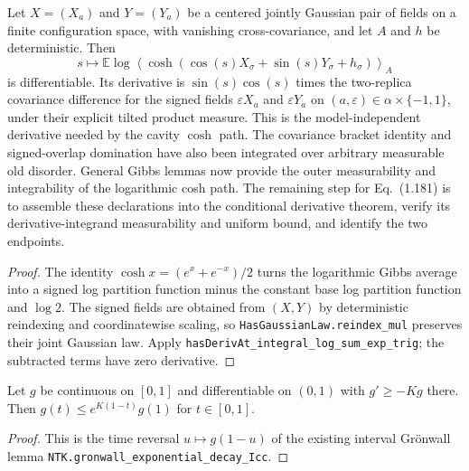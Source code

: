 \begin{lemma}
\label{lem:sg-tal:log-cosh-gaussian-derivative}
  \leanok
{}
Let $X=(X_a)$ and $Y=(Y_a)$ be a centered jointly Gaussian pair of fields on a finite
configuration space, with vanishing cross-covariance, and let $A$ and $h$ be deterministic.
Then
\[
 s\longmapsto \mathbb E\log\left\langle
   \cosh(\cos(s)X_\sigma+\sin(s)Y_\sigma+h_\sigma)\right\rangle_A
\]
is differentiable.  Its derivative is $\sin(s)\cos(s)$ times the two-replica covariance
difference for the signed fields $\varepsilon X_a$ and $\varepsilon Y_a$ on
$(a,\varepsilon)\in\alpha\times\{-1,1\}$, under their explicit tilted product measure.
This is the model-independent derivative needed by the cavity $\cosh$ path.  The covariance
bracket identity and signed-overlap domination have also been integrated over arbitrary
measurable old disorder.  General Gibbs lemmas now provide the outer measurability and
integrability of the logarithmic cosh path.  The remaining step for Eq.~(1.181) is to assemble
these declarations into the conditional derivative theorem, verify its derivative-integrand
measurability and uniform bound, and identify the two endpoints.
\end{lemma}
\begin{proof}
  \leanok
The identity $\cosh x=(e^x+e^{-x})/2$ turns the logarithmic Gibbs average into a signed log
partition function minus the constant base log partition function and $\log 2$.
The signed fields are obtained from $(X,Y)$ by deterministic reindexing and coordinatewise
scaling, so \texttt{HasGaussianLaw.reindex\_mul} preserves their joint Gaussian law.
Apply \texttt{hasDerivAt\_integral\_log\_sum\_exp\_trig}; the subtracted terms have zero derivative.
\end{proof}

\begin{lemma}
\label{lem:sg-tal:gronwall-backward}
  \leanok
{}
Let $g$ be continuous on $[0,1]$ and differentiable on $(0,1)$ with $g'\ge-Kg$ there. Then
$g(t)\le e^{K(1-t)}g(1)$ for $t\in[0,1]$.
\end{lemma}
\begin{proof}
  \leanok
This is the time reversal $u\mapsto g(1-u)$ of the existing interval Gr\"onwall lemma
\texttt{NTK.gronwall\_exponential\_decay\_Icc}.
\end{proof}

